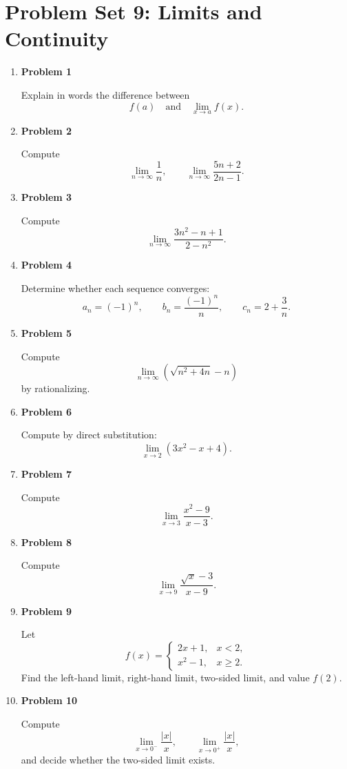 \section{Problem Set 9: Limits and Continuity}

\begin{enumerate}
\item \textbf{Problem 1}\par
Explain in words the difference between
\[
f(a)
\quad\text{and}\quad
\lim_{x\to a}f(x).
\]

\item \textbf{Problem 2}\par
Compute
\[
\lim_{n\to\infty}\frac{1}{n},
\qquad
\lim_{n\to\infty}\frac{5n+2}{2n-1}.
\]

\item \textbf{Problem 3}\par
Compute
\[
\lim_{n\to\infty}\frac{3n^2-n+1}{2-n^2}.
\]

\item \textbf{Problem 4}\par
Determine whether each sequence converges:
\[
a_n=(-1)^n,
\qquad
b_n=\frac{(-1)^n}{n},
\qquad
c_n=2+\frac{3}{n}.
\]

\item \textbf{Problem 5}\par
Compute
\[
\lim_{n\to\infty}\left(\sqrt{n^2+4n}-n\right)
\]
by rationalizing.

\item \textbf{Problem 6}\par
Compute by direct substitution:
\[
\lim_{x\to2}(3x^2-x+4).
\]

\item \textbf{Problem 7}\par
Compute
\[
\lim_{x\to3}\frac{x^2-9}{x-3}.
\]

\item \textbf{Problem 8}\par
Compute
\[
\lim_{x\to9}\frac{\sqrt{x}-3}{x-9}.
\]

\item \textbf{Problem 9}\par
Let
\[
f(x)=
\begin{cases}
2x+1,&x<2,\\
x^2-1,&x\ge2.
\end{cases}
\]
Find the left-hand limit, right-hand limit, two-sided limit, and value \(f(2)\).

\item \textbf{Problem 10}\par
Compute
\[
\lim_{x\to0^-}\frac{|x|}{x},
\qquad
\lim_{x\to0^+}\frac{|x|}{x},
\]
and decide whether the two-sided limit exists.


\end{enumerate}
